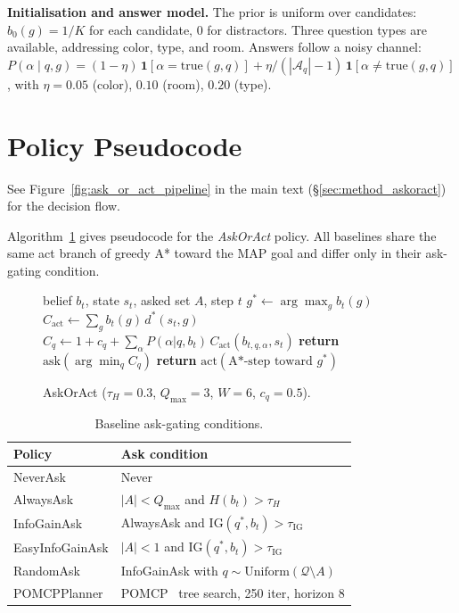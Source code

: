 \documentclass[10pt,twocolumn]{article}
\begin{document}
\textbf{Initialisation and answer model.}
The prior is uniform over candidates: $b_0(g) = 1/K$ for each candidate, $0$ for distractors.
Three question types are available, addressing color, type, and room.
Answers follow a noisy channel: $P(\alpha \mid q, g) = (1{-}\eta)\,\mathbf{1}[\alpha {=} \mathrm{true}(g,q)] + \eta/(|\mathcal{A}_q|{-}1)\,\mathbf{1}[\alpha {\neq} \mathrm{true}(g,q)]$, with $\eta{=}0.05$ (color), $0.10$ (room), $0.20$ (type).

\section{Policy Pseudocode}
\label{app:pseudocode}

See Figure~\ref{fig:ask_or_act_pipeline} in the main text (\S\ref{sec:method_askoract}) for the decision flow.

Algorithm~\ref{alg:askoract} gives pseudocode for the \textit{AskOrAct} policy.
All baselines share the same act branch of greedy A* toward the MAP goal and differ only in their ask-gating condition.

\begin{figure}[h]
\small
\begin{algorithmic}[1]
\Require belief $b_t$, state $s_t$, asked set $A$, step $t$
\State $g^* \gets \arg\max_g b_t(g)$  
\State $C_{\mathrm{act}} \gets \sum_g b_t(g)\,d^*(s_t, g)$
    \State $C_q \gets 1 + c_q + \sum_\alpha P(\alpha|q,b_t)\,C_{\mathrm{act}}(b_{t,q,\alpha},s_t)$
  \EndFor
    \State \textbf{return} $\mathrm{ask}(\arg\min_q C_q)$
  \EndIf
\EndIf
\State \textbf{return} $\mathrm{act}(\text{A*-step toward } g^*)$
\end{algorithmic}
\caption{AskOrAct ($\tau_H{=}0.3$, $Q_{\max}{=}3$, $W{=}6$, $c_q{=}0.5$).}
\label{alg:askoract}
\end{figure}

\begin{table}[h]
\centering
\caption{Baseline ask-gating conditions.}
\label{tab:baselines_conditions}
\small
\begin{tabular}{lp{4.2cm}}
\toprule
Policy & Ask condition \\
\midrule
NeverAsk & Never \\
AlwaysAsk & $|A|<Q_{\max}$ and $H(b_t)>\tau_H$ \\
InfoGainAsk & AlwaysAsk and $\mathrm{IG}(q^*,b_t)>\tau_{\mathrm{IG}}$ \\
EasyInfoGainAsk & $|A|<1$ and $\mathrm{IG}(q^*,b_t)>\tau_{\mathrm{IG}}$ \\
RandomAsk & InfoGainAsk with $q \sim \mathrm{Uniform}(\mathcal{Q}\setminus A)$ \\
POMCPPlanner & POMCP~\cite{silver2010pomcp} tree search, 250 iter, horizon 8 \\
\bottomrule
\end{tabular}
\end{table}
\end{document}
